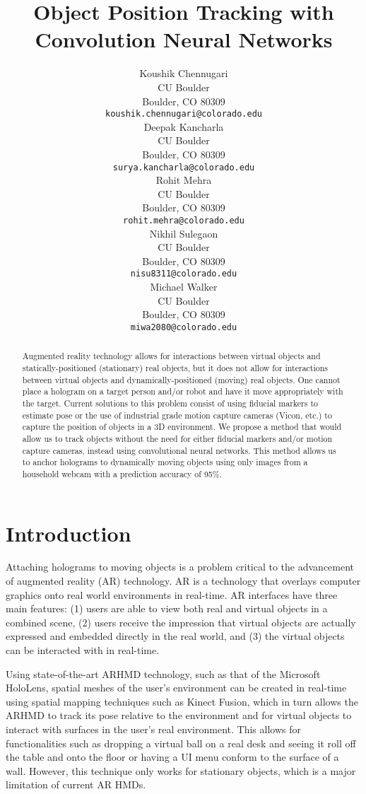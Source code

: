 \documentclass{article}
\title{Object Position Tracking with Convolution Neural Networks}
\author{
  Koushik Chennugari\\
  CU Boulder\\
  Boulder, CO 80309 \\
  \texttt{koushik.chennugari@colorado.edu} \\
  \And
  Deepak Kancharla\\
  CU Boulder\\
  Boulder, CO 80309 \\
  \texttt{surya.kancharla@colorado.edu} \\
  \And
  Rohit Mehra\\
  CU Boulder\\
  Boulder, CO 80309 \\
  \texttt{rohit.mehra@colorado.edu} \\
  \And
  Nikhil Sulegaon\\
  CU Boulder\\
  Boulder, CO 80309 \\
  \texttt{nisu8311@colorado.edu} \\
  \And
  Michael Walker\\
  CU Boulder\\
  Boulder, CO 80309 \\
  \texttt{miwa2080@colorado.edu} \\
}
\begin{document}

\maketitle

\begin{abstract}
Augmented reality technology allows for interactions between virtual objects and statically-positioned (stationary) real objects, but it does not allow for interactions between virtual objects and dynamically-positioned (moving) real objects. One cannot place a hologram on a target person and/or robot and have it move appropriately with the target. Current solutions to this problem consist of using fiducial markers to estimate pose or the use of industrial grade motion capture cameras (Vicon, etc.) to capture the position of objects in a 3D environment. We propose a method that would allow us to track objects without the need for either fiducial markers and/or motion capture cameras, instead using convolutional neural networks. This method allows us to anchor holograms to dynamically moving objects using only images from a household webcam with a prediction accuracy of 95\%.
\end{abstract}

\section{Introduction}

Attaching holograms to moving objects is a problem critical to the advancement of augmented reality (AR) technology. AR is a technology that overlays computer graphics onto real world environments in real-time. AR interfaces have three main features: (1) users are able to view both real and virtual objects in a combined scene, (2) users receive the impression that virtual objects are actually expressed and embedded directly in the real world, and (3) the virtual objects can be interacted with in real-time.

Using state-of-the-art ARHMD technology, such as that of the Microsoft HoloLens, spatial meshes of the user’s environment can be created in real-time using spatial mapping techniques such as Kinect Fusion, which in turn allows the ARHMD to track its pose relative to the environment and for virtual objects to interact with surfaces in the user’s real environment. This allows for functionalities such as dropping a virtual ball on a real desk and seeing it roll off the table and onto the floor or having a UI menu conform to the surface of a wall. However, this technique only works for stationary objects, which is a major limitation of current AR HMDs.
\end{document}
